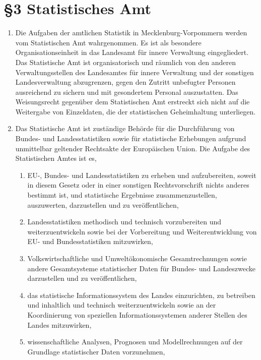     \section{\S3 Statistisches Amt}
        \begin{enumerate}[label=(\arabic*)]
            \item Die Aufgaben der amtlichen Statistik in Mecklenburg-Vorpommern werden vom Statistischen Amt wahrgenommen. Es ist als besondere Organisationseinheit in das Landesamt für innere Verwaltung eingegliedert. Das Statistische Amt ist organisatorisch und räumlich von den anderen Verwaltungsstellen des Landesamtes für innere Verwaltung und der sonstigen Landesverwaltung abzugrenzen, gegen den Zutritt unbefugter Personen ausreichend zu sichern und mit gesondertem Personal auszustatten. Das Weisungsrecht gegenüber dem Statistischen Amt erstreckt sich nicht auf die Weitergabe von Einzeldaten, die der statistischen Geheimhaltung unterliegen.
            \item Das Statistische Amt ist zuständige Behörde für die Durchführung von Bundes- und Landesstatistiken sowie für statistische Erhebungen aufgrund unmittelbar geltender Rechtsakte der Europäischen Union. Die Aufgabe des Statistischen Amtes ist es,
            \begin{enumerate}[label=\arabic*.]
                \item EU-, Bundes- und Landesstatistiken zu erheben und aufzubereiten, soweit in diesem Gesetz oder in einer sonstigen Rechtsvorschrift nichts anderes bestimmt ist, und statistische Ergebnisse zusammenzustellen, auszuwerten, darzustellen und zu veröffentlichen,
                \item Landesstatistiken methodisch und technisch vorzubereiten und weiterzuentwickeln sowie bei der Vorbereitung und Weiterentwicklung von EU- und Bundesstatistiken mitzuwirken,
                \item Volkswirtschaftliche und Umweltökonomische Gesamtrechnungen sowie andere Gesamtsysteme statistischer Daten für Bundes- und Landeszwecke darzustellen und zu veröffentlichen,
                \item das statistische Informationssystem des Landes einzurichten, zu betreiben und inhaltlich und technisch weiterzuentwickeln sowie an der Koordinierung von speziellen Informationssystemen anderer Stellen des Landes mitzuwirken,
                \item wissenschaftliche Analysen, Prognosen und Modellrechnungen auf der Grundlage statistischer Daten vorzunehmen,

\end{enumerate}
\end{enumerate}
